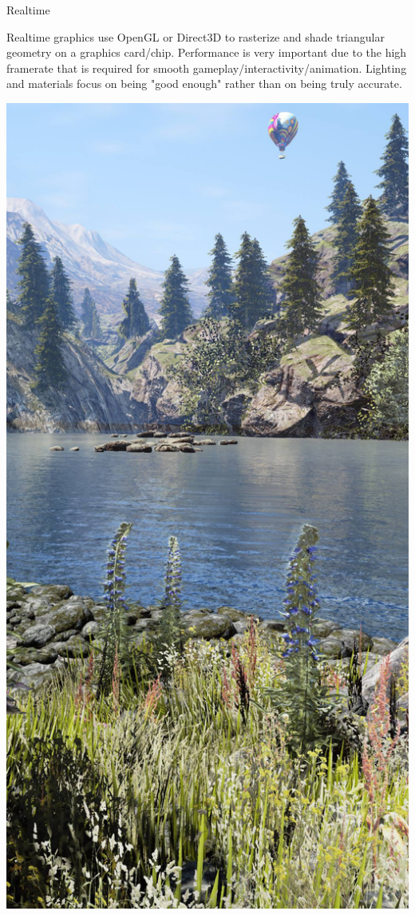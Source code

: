 \documentclass{lug}
\newcommand{\splitslide}[4]{
    \noindent
    \begin{minipage}{#1 \textwidth - #2 }
        #3
    \end{minipage}%
    \hspace{ \dimexpr #2 * 2 \relax }%
    \begin{minipage}{\textwidth - #1 \textwidth - #2 }
        #4
    \end{minipage}
}
\begin{document}
\begin{frame}{Realtime}
    \splitslide{0.7}{.7em}{
        \small

        Realtime graphics use OpenGL or Direct3D to rasterize and shade
        triangular geometry on a graphics card/chip. Performance is very
        important due to the high framerate that is required for smooth
        gameplay/interactivity/animation. Lighting and materials focus on
        being "good enough" rather than on being truly accurate.

    }{
        \includegraphics[width=\textwidth]{graphics/game_graphics}
    }
\end{frame}
\end{document}
